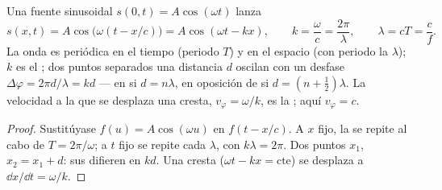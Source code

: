 \begin{proposition}\label{prop:b1:wave-propagation:sinusoidal}
Una fuente sinusoidal $s(0, t) = A\cos(\omega t)$ lanza
\[
s(x, t) = A\cos\!\big(\omega(t - x/c)\big) = A\cos(\omega t - kx),
\qquad k = \frac{\omega}{c} = \frac{2\pi}{\lambda},
\qquad \lambda = cT = \frac{c}{f}.
\]
La onda es periódica en el tiempo (periodo $T$) y en el espacio (con
periodo la \emph{} $\lambda$); $k$ es el \emph{}; dos puntos separados una distancia $d$ oscilan con un desfase
$\Delta\varphi = 2\pi d/\lambda = kd$ --- en  si $d = n\lambda$, en
oposición de  si $d = (n + \tfrac12)\lambda$. La velocidad a la que se
desplaza una cresta, $v_\varphi = \omega/k$, es la \emph{}; aquí $v_\varphi = c$.
\end{proposition}

\begin{proof}
Sustitúyase $f(u) = A\cos(\omega u)$ en $f(t - x/c)$. A $x$ fijo, la 
se repite al cabo de $T = 2\pi/\omega$; a $t$ fijo se repite cada
$\lambda$, con $k\lambda = 2\pi$. Dos puntos $x_1$, $x_2 = x_1 + d$: sus
 difieren en $kd$. Una cresta ($\omega t - kx = \text{cte}$) se
desplaza a $\dd x/\dd t = \omega/k$.
\end{proof}

